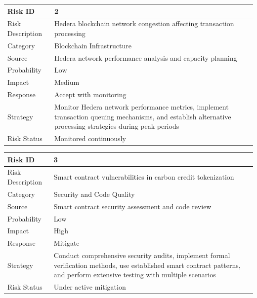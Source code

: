 \documentclass[oneside,a4paper,12pt]{book}
\renewcommand{\arraystretch}{1.4}
\begin{document}
\begin{table}[!htbp]
\begin{center}
\def\arraystretch{1.5}
\begin{tabularx}{\textwidth}{| l | X |}
\hline 
Risk ID	& 2 \\ \hline
Risk Description	& Hedera blockchain network congestion affecting transaction processing \\ \hline
Category	& Blockchain Infrastructure \\ \hline
Source	& Hedera network performance analysis and capacity planning \\ \hline
Probability	& Low \\ \hline
Impact	& Medium \\ \hline
Response	& Accept with monitoring \\ \hline
Strategy	& Monitor Hedera network performance metrics, implement transaction queuing mechanisms, and establish alternative processing strategies during peak periods \\ \hline
Risk Status	& Monitored continuously \\ \hline
\end{tabularx}
\end{center}
\label{tab:risk2}
\end{table}

\begin{table}[!htbp]
\begin{center}
\def\arraystretch{1.5}
\begin{tabularx}{\textwidth}{| l | X |}
\hline 
Risk ID	& 3 \\ \hline
Risk Description	& Smart contract vulnerabilities in carbon credit tokenization \\ \hline
Category	& Security and Code Quality \\ \hline
Source	& Smart contract security assessment and code review \\ \hline
Probability	& Low \\ \hline
Impact	& High \\ \hline
Response	& Mitigate \\ \hline
Strategy	& Conduct comprehensive security audits, implement formal verification methods, use established smart contract patterns, and perform extensive testing with multiple scenarios \\ \hline
Risk Status	& Under active mitigation \\ \hline
\end{tabularx}
\end{center}
\label{tab:risk3}
\end{table}
\end{document}
